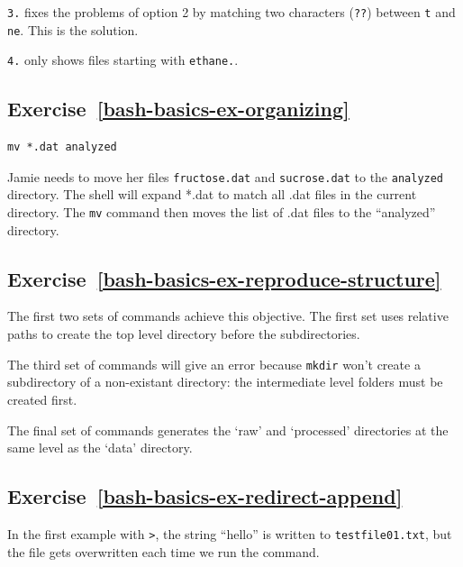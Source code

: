 \documentclass[
]{krantz}
\begin{document}
\texttt{3.} fixes the problems of option 2 by matching two characters (\texttt{??}) between \texttt{t} and \texttt{ne}.
This is the solution.

\texttt{4.} only shows files starting with \texttt{ethane.}.

\hypertarget{exercise-refbash-basics-ex-organizing}{%
\subsection*{Exercise~\ref{bash-basics-ex-organizing}}\label{exercise-refbash-basics-ex-organizing}}


\begin{verbatim}
mv *.dat analyzed
\end{verbatim}

Jamie needs to move her files \texttt{fructose.dat} and \texttt{sucrose.dat} to the \texttt{analyzed} directory.
The shell will expand *.dat to match all .dat files in the current directory.
The \texttt{mv} command then moves the list of .dat files to the ``analyzed'' directory.

\hypertarget{exercise-refbash-basics-ex-reproduce-structure}{%
\subsection*{Exercise~\ref{bash-basics-ex-reproduce-structure}}\label{exercise-refbash-basics-ex-reproduce-structure}}


The first two sets of commands achieve this objective.
The first set uses relative paths to create the top level directory before
the subdirectories.

The third set of commands will give an error because \texttt{mkdir} won't create a subdirectory
of a non-existant directory: the intermediate level folders must be created first.

The final set of commands generates the `raw' and `processed' directories at the same level
as the `data' directory.

\hypertarget{exercise-refbash-basics-ex-redirect-append}{%
\subsection*{Exercise~\ref{bash-basics-ex-redirect-append}}\label{exercise-refbash-basics-ex-redirect-append}}


In the first example with \texttt{\textgreater{}}, the string ``hello'' is written to \texttt{testfile01.txt},
but the file gets overwritten each time we run the command.
\end{document}
